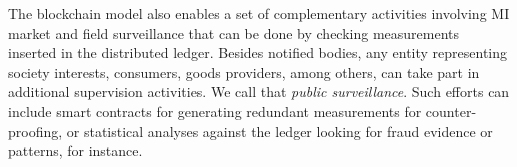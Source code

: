 \documentclass[journal]{IEEEtran} %
\begin{document}
The blockchain model also enables a set of complementary activities involving MI market and field surveillance that can be done by checking measurements inserted in the distributed ledger. Besides notified bodies, any entity representing society interests, consumers, goods providers, among others, can take part in additional supervision activities. We call that \emph{public surveillance}. Such efforts can include smart contracts for generating redundant measurements for counter-proofing, or statistical analyses against the ledger looking for fraud evidence or patterns, for instance.






\end{document}
